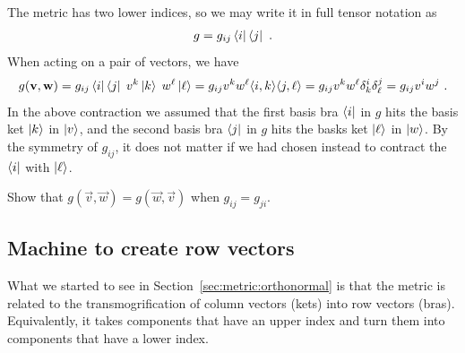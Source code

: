 \documentclass[12pt]{article}
\begin{document}
The metric has two lower indices, so we may write it in full tensor notation as
\begin{align}
    g = g_{ij} \left\langle i\right|\left\langle j\right| \ .
\end{align}
When acting on a pair of vectors, we have
\begin{align}
    g(\mathbf{v},\mathbf{w}) = 
    g_{ij} \left\langle i\right|\left\langle j\right|
    \; v^k\left|k\right\rangle
    \; w^\ell \left|\ell\right\rangle
    = 
    g_{ij}v^k w^\ell \langle{i},{k}\rangle\langle j , \ell \rangle
    =
    g_{ij}v^k w^\ell \delta^i_k \delta^j_\ell
    =
    g_{ij}v^i w^j \ .
    \label{eq:metric:acting:kets}
\end{align}
In the above contraction we assumed that the first basis bra $\left\langle i\right|$ in $g$ hits the basis ket $\left|k\right\rangle$ in $\left|v\right\rangle$, and the second basis bra $\left\langle j\right|$ in $g$ hits the basks ket $\left|\ell\right\rangle$ in $\left|w\right\rangle$. By the symmetry of $g_{ij}$, it does not matter if we had chosen instead to contract the $\left\langle i\right|$ with $\left|\ell\right\rangle$. 
\begin{exercise}
Show that $g(\vec{v},\vec{w})  = g(\vec{w},\vec{v})$ when $g_{ij} = g_{ji}$.
\end{exercise}




\subsection{Machine to create row vectors}
\label{sec:machine:to:make:row:vectors}

What we started to see in Section~\ref{sec:metric:orthonormal} is that the metric is related to the transmogrification of column vectors (kets) into row vectors (bras). Equivalently, it takes components that have an upper index and turn them into components that have a lower index. 
\end{document}
